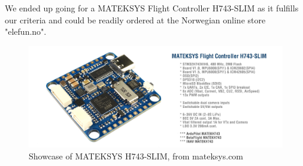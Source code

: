 We ended up going for a MATEKSYS Flight Controller H743-SLIM \cite{MateksysH743-SLIM} as it fulfills our criteria and could be readily ordered at the Norwegian online store "elefun.no".

\begin{figure}[!htb]
    \centering
    \includegraphics[width=\textwidth]{fig/H743-SLIM_1.jpg}
    \caption{Showcase of MATEKSYS H743-SLIM, from mateksys.com \protect\cite{MateksysH743-SLIM}}
\end{figure}

\newpage

